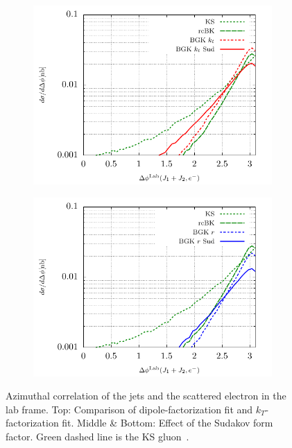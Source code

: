 \documentclass[11pt]{article}
\numberwithin{equation}{section}
\numberwithin{table}{section}
\numberwithin{figure}{section}
\begin{document}
\begin{figure}[p]
	\begin{subfigure}{0.5\textwidth}
		\includegraphics[width=\textwidth]{plots/plotBGK2Lab}
	\end{subfigure}
	\begin{subfigure}{0.5\textwidth}
		\includegraphics[width=\textwidth]{plots/plotBGK3Lab}
	\end{subfigure}
\caption{\footnotesize Azimuthal correlation of the jets and the scattered electron in the lab frame. Top: Comparison of dipole-factorization fit and $k_T$-factorization fit. Middle \& Bottom: Effect of the Sudakov form factor.  Green dashed line is the KS gluon~\cite{vanHameren:2021sqc}.}
\label{fig:je-lab}
\end{figure}
\end{document}
